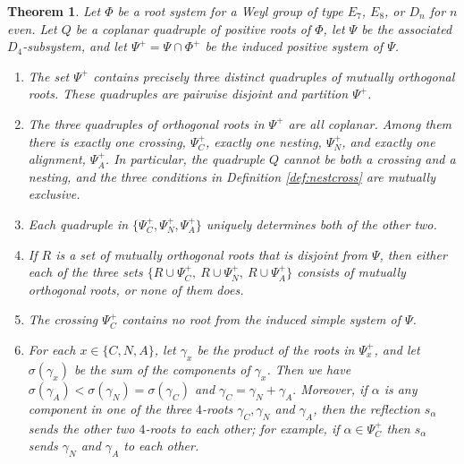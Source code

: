 \documentclass[11pt]{amsart}
\theoremstyle{plain}
\newtheorem{theorem}{Theorem}[section]
\theoremstyle{definition}
\theoremstyle{remark}
\numberwithin{equation}{subsection}
\newcommand{\al}{\alpha}
\newcommand{\coplanar}{coplanar\xspace}
\newcommand{\posroots}{\Phi^+}
\newcommand{\allroots}{\Phi}
\begin{document}
\begin{theorem}\label{thm:cna}
Let $\allroots$ be a root system for a Weyl group of type $E_7$, $E_8$, or $D_n$
for $n$ even.  Let $Q$ be a \coplanar quadruple of positive roots of
$\allroots$, let $\Psi$ be the associated $D_4$-subsystem, and let $\Psi^+ =
\Psi \cap \posroots$ be the induced positive system of $\Psi$.
\begin{enumerate}
\item[{\rm (i)}]
The set $\Psi^+$ contains precisely three distinct quadruples of mutually
orthogonal roots. These quadruples are pairwise disjoint and partition $\Psi^+$.

\item[{\rm (ii)}]
The three quadruples of orthogonal roots in $\Psi^+$  are all coplanar. Among
them there is exactly one crossing, $\Psi^+_C$, exactly one nesting, $\Psi^+_N$,
and exactly one alignment, $\Psi^+_A$. In particular, the quadruple $Q$ cannot
be both a crossing and a nesting, and the three conditions in Definition
\ref{def:nestcross} are mutually exclusive.

\item[{\rm (iii)}]
Each quadruple in $\{\Psi^+_C,\Psi^+_N, \Psi^+_A\}$ uniquely determines both of
the other two.

\item[{\rm (iv)}]
{If $R$ is a set of mutually orthogonal roots that is disjoint from $\Psi$, then
either each of the three sets $\{R \cup \Psi^+_C, \ R \cup \Psi^+_N, \ R \cup
\Psi^+_A\}$ consists of mutually orthogonal roots, or none of them does.}

\item[{\rm (v)}]
The crossing $\Psi^+_C$ contains no root from the induced simple system of
$\Psi$.

\item[{\rm (vi)}]
For each $x\in \{C,N,A\}$, let $\gamma_x$ be the product of the roots in
$\Psi^+_x$, and let $\sigma(\gamma_x)$ be the sum of the components of $\gamma_x$. Then we have $\sigma(\gamma_A) < \sigma(\gamma_N) =
\sigma(\gamma_C)$ and $\gamma_C = \gamma_N + \gamma_A.$ Moreover, if $\al$ is
any component in one of the three $4$-roots $\gamma_C,\gamma_N$ and $\gamma_A$,
then the reflection $s_\al$ sends the other two $4$-roots to each other; for
example, if $\al\in \Psi^+_C$ then $s_\al$ sends $\gamma_N$ and $\gamma_A$ to
each other.
\end{enumerate}
\end{theorem}
\end{document}
